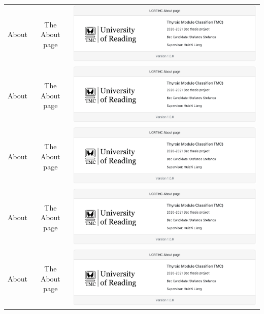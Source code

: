 \begin{center}
\begin{tabular}{ |c|c|c| }
					About & The About page &\includegraphics[scale=0.2]{figures/component-about}\\
					About & The About page &\includegraphics[scale=0.2]{figures/component-about}\\
					About & The About page &\includegraphics[scale=0.2]{figures/component-about}\\
					About & The About page &\includegraphics[scale=0.2]{figures/component-about}\\
					About & The About page &\includegraphics[scale=0.2]{figures/component-about}\\

\end{tabular}
\end{center}
